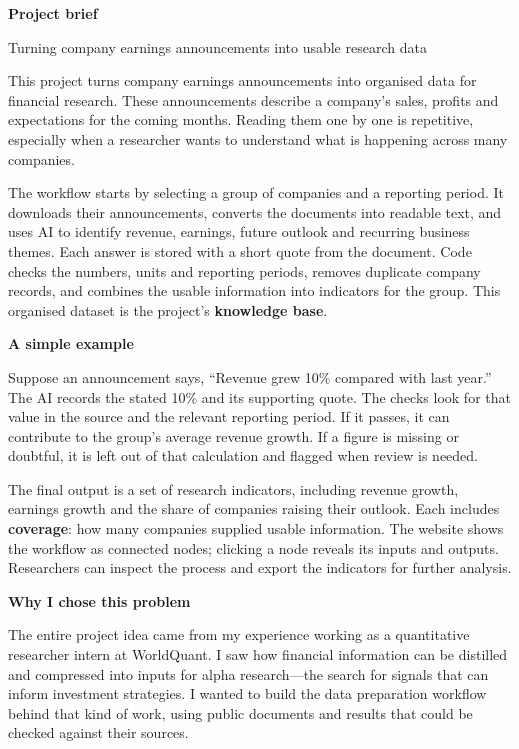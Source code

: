 \documentclass[10pt,a4paper]{article}
\newcommand{\topic}[1]{\par\vspace{5pt}{\large\bfseries\color{teal}#1}\par\vspace{1pt}}
\newcommand{\smalltopic}[1]{\par\vspace{3pt}\textbf{#1}\par}
\begin{document}
\thispagestyle{fancy}
{\fontsize{25}{28}\selectfont\bfseries Project brief}\par
{\large Turning company earnings announcements into usable research data}

\topic{1\enspace What this project does}
This project turns company earnings announcements into organised data for financial
research. These announcements describe a company's sales, profits and expectations
for the coming months. Reading them one by one is repetitive, especially when a
researcher wants to understand what is happening across many companies.

The workflow starts by selecting a group of companies and a reporting period. It
downloads their announcements, converts the documents into readable text, and uses
AI to identify revenue, earnings, future outlook and recurring business themes.
Each answer is stored with a short quote from the document. Code checks the numbers,
units and reporting periods, removes duplicate company records, and combines the
usable information into indicators for the group. This organised dataset is the
project's \textbf{knowledge base}.

\smalltopic{A simple example}
Suppose an announcement says, ``Revenue grew 10\% compared with last year.'' The AI
records the stated 10\% and its supporting quote. The checks look for that value in
the source and the relevant reporting period. If it passes, it can contribute to the
group's average revenue growth. If a figure is missing or doubtful, it is left out of
that calculation and flagged when review is needed.

The final output is a set of research indicators, including revenue growth, earnings
growth and the share of companies raising their outlook. Each includes
\textbf{coverage}: how many companies supplied usable information. The website shows
the workflow as connected nodes; clicking a node reveals its inputs and outputs.
Researchers can inspect the process and export the indicators for further analysis.

\smalltopic{Why I chose this problem}
The entire project idea came from my experience working as a quantitative researcher
intern at WorldQuant. I saw how financial information can be distilled and compressed
into inputs for alpha research---the search for signals that can inform investment
strategies. I wanted to build the data preparation workflow behind that kind of work,
using public documents and results that could be checked against their sources.
\end{document}
